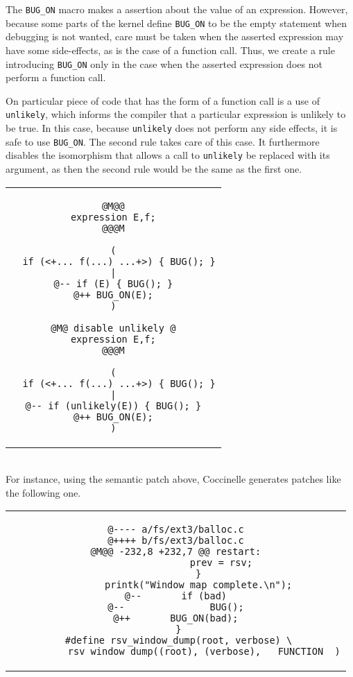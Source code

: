 \newpage

The \texttt{BUG\_ON} macro makes a assertion about the value of an
expression. However, because some parts of the kernel define
\texttt{BUG\_ON} to be the empty statement when debugging is not wanted,
care must be taken when the asserted expression may have some side-effects,
as is the case of a function call. Thus, we create a rule introducing
\texttt{BUG\_ON} only in the case when the asserted expression does not
perform a function call.

On particular piece of code that has the form of a function call is a use
of \texttt{unlikely}, which informs the compiler that a particular
expression is unlikely to be true.  In this case, because \texttt{unlikely}
does not perform any side effects, it is safe to use \texttt{BUG\_ON}.  The
second rule takes care of this case.  It furthermore disables the
isomorphism that allows a call to \texttt{unlikely} be replaced with its
argument, as then the second rule would be the same as the first one.\\

\begin{tabular}{c}
\begin{lstlisting}[language=Cocci,name=bugon]
@M@@
expression E,f;
@@@M

(
  if (<+... f(...) ...+>) { BUG(); }
|
@-- if (E) { BUG(); }
@++ BUG_ON(E);
)

@M@ disable unlikely @
expression E,f;
@@@M

(
  if (<+... f(...) ...+>) { BUG(); }
|
@-- if (unlikely(E)) { BUG(); }
@++ BUG_ON(E);
)
\end{lstlisting}\\
\end{tabular}\\

For instance, using the semantic patch above, Coccinelle generates
patches like the following one.

\begin{tabular}{c}
\begin{lstlisting}[language=PatchC]
@---- a/fs/ext3/balloc.c
@++++ b/fs/ext3/balloc.c
@M@@ -232,8 +232,7 @@ restart:
                prev = rsv;
        }
        printk("Window map complete.\n");
@--       if (bad)
@--               BUG();
@++       BUG_ON(bad);
 }
 #define rsv_window_dump(root, verbose) \
        __rsv_window_dump((root), (verbose), __FUNCTION__)
\end{lstlisting}
\end{tabular}

